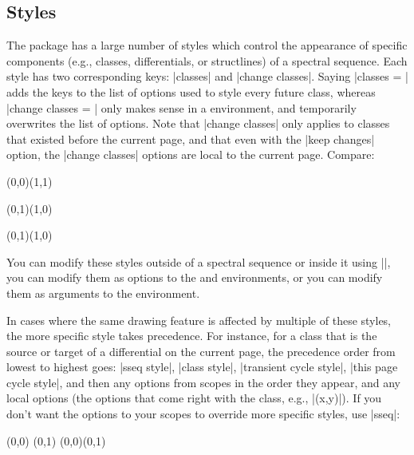 \begin{sseqdata}[|| name = ex1, cohomological Serre grading]
\section{Styles}
The \sseqpages\space package has a large number of styles which control the appearance of specific components (e.g., classes, differentials, or structlines) of a spectral sequence. Each style has two corresponding keys: |classes| and |change classes|.  Saying |classes = | adds the keys to the list of options used to style every future class, whereas |change classes = | only makes sense in a \sseqpageenv\space environment, and temporarily overwrites the list of options. Note that |change classes| only applies to classes that existed before the current page, and that even with the |keep changes| option, the |change classes| options are local to the current page. Compare:
\begin{codeexample}[width = 8cm]
\begin{sseqdata}[ name = stylesex ]
\class(0,0)\class(1,1)
\end{sseqdata}
\begin{sseqpage}[ name = stylesex,
                  classes = { fill, blue },
                  title = change new classes ]
\class(0,1)\class(1,0)
\end{sseqpage}
\quad
\begin{sseqpage}[ name = stylesex,
                  change classes = { fill, blue },
                  title = change old classes ]
\class(0,1)\class(1,0)
\end{sseqpage}
\end{codeexample}

You can modify these styles outside of a spectral sequence or inside it using |\sseqset|, you can modify them as options to the \sseqdataenv\space and \sseqpageenv\space environments, or you can modify them as arguments to the \scopeenv\space environment.

In cases where the same drawing feature is affected by multiple of these styles, the more specific style takes precedence. For instance, for a class that is the source or target of a differential on the current page, the precedence order from lowest to highest goes: |sseq style|, |class style|, |transient cycle style|, |this page cycle style|, and then any options from scopes in the order they appear, and any local options (the options that come right with the class, e.g., |(x,y)|). If you don't want the options to your scopes to override more specific styles, use |sseq|:
\begin{codeexample}[width = 7cm]
\begin{sseqpage}[ classes = { blue, fill },
   title style = { align = center, text width = 2.4cm },
   title = { everything is orange } ]
\begin{scope}[orange]
\class(0,0) \class(0,1)
\structline(0,0)(0,1)
\end{scope}
\end{sseqpage}


\end{codeexample}
\end{sseqdata}
